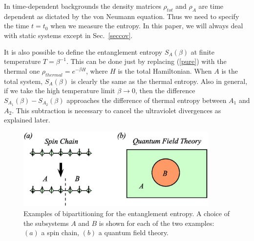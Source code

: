 \documentclass[12pt]{article}
\begin{document}
In time-dependent
backgrounds the density matrices $\rho_{tot}$ and $\rho_A$ are time
dependent as dictated by the von Neumann equation. Thus we need to
specify the time $t=t_0$ when we measure the entropy. In this paper, we will always deal with
static systems except in Sec.\ \ref{seccov}.



It is also possible to define the entanglement entropy $S_A(\beta)$
at finite temperature $T=\beta^{-1}$.
This can be done just by replacing (\ref{pure}) with the thermal one
$\rho_{thermal}=e^{-\beta H}$,
where $H$ is the total Hamiltonian.
When $A$ is the total system, $S_A(\beta)$ is clearly
the same as the thermal entropy.
Also in general, if we take the high temperature limit $\beta\to 0$, then
the difference $S_{A_1}(\beta)-S_{A_2}(\beta)$ approaches the difference of thermal entropy between $A_1$ and
$A_2$. This subtraction is necessary to cancel the ultraviolet divergences as explained later.


\begin{figure}
\begin{center}
\includegraphics[width=10cm,clip]{spinchain.eps}
\end{center}
\caption{
\label{fig:spinchain}
Examples of bipartitioning for the entanglement entropy.
A choice of the subsystems $A$ and $B$ is shown
for each of the two examples: $(a)$ a spin chain, $(b)$ a quantum field theory.
}
\end{figure}
\end{document}
